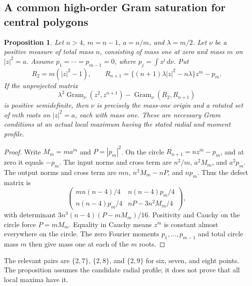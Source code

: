 \documentclass[11pt]{article}
\newtheorem{proposition}[theorem]{Proposition}
\theoremstyle{remark}
\numberwithin{equation}{section}
\begin{document}
\subsection{A common high-order Gram saturation for central polygons}
\begin{proposition}\label{prop:noclass-central-profile}
Let $n>4$, $m=n-1$, $a=n/m$, and $\lambda=m/2$. Let $\nu$ be a
positive measure of total mass $n$, consisting of mass one at zero
and mass $m$ on $|z|^2=a$. Assume $p_1=\cdots=p_{m-1}=0$, where
$p_j=\int z^j\,d\nu$. Put
\[
 R_2=m(|z|^2-1),\qquad
 R_{n+1}=\{(n+1)\lambda|z|^2-n\lambda\}z^m-p_m.
\]
If the unprojected matrix
\[
 \lambda^2\operatorname{Gram}_\nu(z^2,z^{n+1})
       -\operatorname{Gram}_\nu(R_2,R_{n+1})
\]
is positive semidefinite, then $\nu$ is precisely the mass-one
origin and a rotated set of $m$th roots on $|z|^2=a$, each with mass one.
These are necessary Gram conditions at an actual local maximum
having the stated radial and moment profile.
\end{proposition}
\begin{proof}
Write $M_m=ma^m$ and $P=|p_m|^2$. On the circle
$R_{n+1}=nz^m-p_m$, and at zero it equals $-p_m$.
The input norms and cross term are $n^2/m$, $a^2M_m$, and $a^2p_m$.
The output norms and cross term are $mn$, $n^2M_m-nP$, and $np_m$.
Thus the defect matrix is
\[
 \begin{pmatrix}
 mn(n-4)/4&n(n-4)p_m/4\\
 n(n-4)\overline{p_m}/4&nP-3n^2M_m/4
 \end{pmatrix},
\]
with determinant $3n^3(n-4)(P-mM_m)/16$.
Positivity and Cauchy on the circle force $P=mM_m$. Equality in
Cauchy means $z^m$ is constant almost everywhere on the circle.
The zero Fourier moments $p_1,\ldots,p_{m-1}$ and total circle
mass $m$ then give mass one at each of the $m$ roots.
\end{proof}
The relevant pairs are $\{2,7\}$, $\{2,8\}$, and $\{2,9\}$ for
six, seven, and eight points. The proposition assumes the candidate
radial profile; it does not prove that all local maxima have it.
\end{document}
